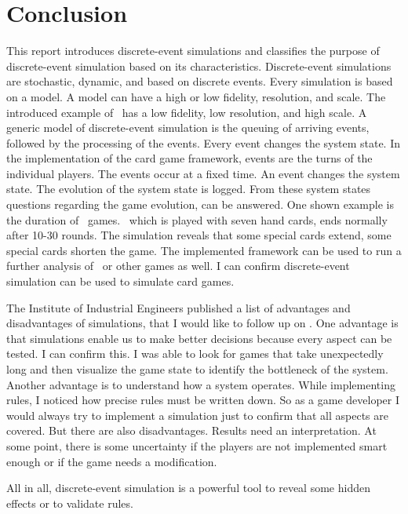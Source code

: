 
\section{Conclusion}

This report introduces discrete-event simulations and classifies the purpose of discrete-event simulation based on its characteristics. Discrete-event simulations are stochastic, dynamic, and based on discrete events.
Every simulation is based on a model. A model can have a high or low fidelity, resolution, and scale. The introduced example of \uno\ has a low fidelity, low resolution, and high scale. A generic model of discrete-event simulation is the queuing of arriving events, followed by the processing of the events. Every event changes the system state. In the implementation of the card game framework, events are the turns of the individual players. The events occur at a fixed time. An event changes the system state. The evolution of the system state is logged. From these system states questions regarding the game evolution, can be answered. One shown example is the duration of \uno\ games. \uno\, which is played with seven hand cards, ends normally after 10-30 rounds. The simulation reveals that some special cards extend, some special cards shorten the game.
The implemented framework can be used to run a further analysis of \uno\ or other games as well. I can confirm discrete-event simulation can be used to simulate card games.

The Institute of Industrial Engineers published a list of advantages and disadvantages of simulations, that I would like to follow up on \cite{sokolowski2010modelingintro}. One advantage is that simulations enable us to make better decisions because every aspect can be tested. I can confirm this. I was able to look for games that take unexpectedly long and then visualize the game state to identify the bottleneck of the system.
Another advantage is to understand how a system operates. While implementing rules, I noticed how precise rules must be written down. So as a game developer I would always try to implement a simulation just to confirm that all aspects are covered.
But there are also disadvantages. Results need an interpretation. At some point, there is some uncertainty if the players are not implemented smart enough or if the game needs a modification.

All in all, discrete-event simulation is a powerful tool to reveal some hidden effects or to validate rules.

